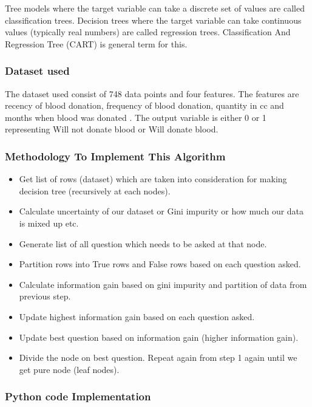 \documentclass[12pt,a4paper]{article}
\begin{document}
\quad Tree models where the target variable can take a discrete set of values are called classification trees. Decision trees where the target variable can take continuous values (typically real numbers) are called regression trees. Classification And Regression Tree (CART) is general term for this. 

 

\subsubsection{Dataset used}

\quad \quad The dataset used consist of 748 data points and four features. The features are recency of blood donation, frequency of blood donation, quantity in cc and months when blood was donated . The output variable is either 0 or 1 representing Will not donate blood or Will donate blood.

\subsubsection{Methodology To Implement This Algorithm}


\begin{itemize}
    \item Get list of rows (dataset) which are taken into consideration for making decision tree (recursively at each nodes).
    \item Calculate uncertainty of our dataset or Gini impurity or how much our data is mixed up etc.
    \item Generate list of all question which needs to be asked at that node.
    \item Partition rows into True rows and False rows based on each question asked. 
    \item Calculate information gain based on gini impurity and partition of data from previous step.
    \item Update highest information gain based on each question asked. 
    \item Update best question based on information gain (higher information gain). 
    \item Divide the node on best question. Repeat again from step 1 again until we get pure node (leaf nodes). 
\end{itemize}


\subsubsection{Python code Implementation}
\end{document}

